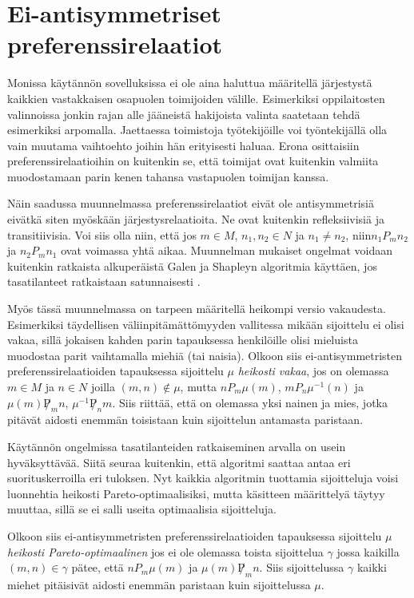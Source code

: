\documentclass[gradu, twoside]{tktltiki}
\begin{document}
\section{Ei-antisymmetriset preferenssirelaatiot}

Monissa käytännön sovelluksissa ei ole aina haluttua määritellä
järjestystä kaikkien vastakkaisen osapuolen toimijoiden välille.
Esimerkiksi oppilaitosten valinnoissa jonkin rajan alle jääneistä
hakijoista valinta saatetaan tehdä esimerkiksi arpomalla. Jaettaessa
toimistoja työtekijöille voi työntekijällä olla vain muutama
vaihtoehto joihin hän erityisesti haluaa. Erona osittaisiin
preferenssirelaatioihin on kuitenkin se, että toimijat ovat kuitenkin
valmiita muodostamaan parin kenen tahansa vastapuolen toimijan kanssa.

Näin saadussa muunnelmassa preferenssirelaatiot eivät ole
antisymmetrisiä eivätkä siten myöskään järjestysrelaatioita. Ne ovat
kuitenkin refleksiivisiä ja transitiivisia. Voi siis olla niin, että
jos $m \in M$, $n_1,n_2 \in N$ ja $n_1 \neq n_2$, niin$n_1P_mn_2$ ja
$n_2P_mn_1$ ovat voimassa yhtä aikaa. Muunnelman mukaiset ongelmat
voidaan kuitenkin ratkaista alkuperäistä Galen ja Shapleyn algoritmia
käyttäen, jos tasatilanteet ratkaistaan satunnaisesti
\cite{gusfield89}.

Myös tässä muunnelmassa on tarpeen määritellä heikompi versio
vakaudesta. Esimerkiksi täydellisen väliinpitämättömyyden vallitessa
mikään sijoittelu ei olisi vakaa, sillä jokaisen kahden parin
tapauksessa henkilöille olisi mieluista muodostaa parit vaihtamalla
miehiä (tai naisia). Olkoon siis ei-antisymmetristen
preferenssirelaatioiden tapauksessa sijoittelu $\mu$ \emph{heikosti
  vakaa}, jos on olemassa $m \in M$ ja $n \in N$ joilla $(m, n) \notin
\mu$, mutta $nP_m\mu(m)$, $mP_n\mu^{-1}(n)$ ja $\mu(m)\not P_mn$,
$\mu^{-1}\not P_nm$. Siis riittää, että on olemassa yksi nainen ja
mies, jotka pitävät aidosti enemmän toisistaan kuin sijoittelun
antamasta paristaan.

Käytännön ongelmissa tasatilanteiden ratkaiseminen arvalla on usein
hyväksyttävää. Siitä seuraa kuitenkin, että algoritmi saattaa antaa
eri suorituskerroilla eri tuloksen. Nyt kaikkia algoritmin tuottamia
sijoitteluja voisi luonnehtia heikosti Pareto-optimaalisiksi, mutta
käsitteen määrittelyä täytyy muuttaa, sillä se ei salli useita
optimaalisia sijoitteluja.

Olkoon siis ei-antisymmetristen preferenssirelaatioiden tapauksessa
sijoittelu $\mu$ \emph{heikosti Pareto-optimaalinen} jos ei ole
olemassa toista sijoittelua $\gamma$ jossa kaikilla $(m, n) \in
\gamma$ pätee, että $nP_m\mu(m)$ ja $\mu(m)\not P_mn$. Siis
sijoittelussa $\gamma$ kaikki miehet pitäisivät aidosti enemmän
paristaan kuin sijoittelussa $\mu$.
\end{document}
